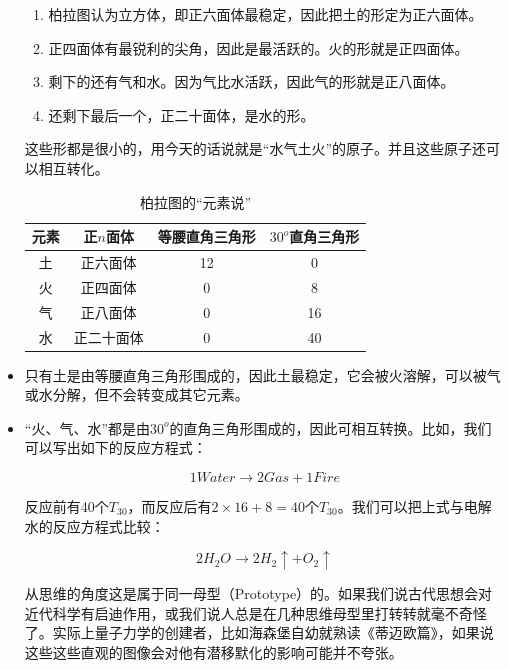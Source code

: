 \begin{itemize}
\begin{enumerate}
\item 柏拉图认为立方体，即正六面体最稳定，因此把土的形定为正六面体。
\item 正四面体有最锐利的尖角，因此是最活跃的。火的形就是正四面体。
\item 剩下的还有气和水。因为气比水活跃，因此气的形就是正八面体。
\item 还剩下最后一个，正二十面体，是水的形。
\end{enumerate}

这些形都是很小的，用今天的话说就是“水气土火”的原子。并且这些原子还可以相互转化。

\begin{table}[htdp]
\caption{柏拉图的“元素说”}
\begin{center}
\begin{tabular}{|c|c|c|c|}
\hline
元素 & 正$n$面体 & 等腰直角三角形 & $30^o$直角三角形 \\
\hline
土 & 正六面体 & 12 & 0  \\
火 & 正四面体 & 0 & 8 \\
气 & 正八面体 & 0 & 16 \\
水 & 正二十面体 & 0 & 40\\
\hline
\end{tabular}
\end{center}
\label{default}
\end{table}%

\item

只有土是由等腰直角三角形围成的，因此土最稳定，它会被火溶解，可以被气或水分解，但不会转变成其它元素。

\item 

“火、气、水”都是由$30^o$的直角三角形围成的，因此可相互转换。比如，我们可以写出如下的反应方程式：

\begin{equation*}
1 Water \to 2 Gas + 1 Fire 
\end{equation*}

反应前有40个$T_{30}$，而反应后有$2 \times 16 + 8 = 40$个$T_{30}$。我们可以把上式与电解水的反应方程式比较：

\begin{equation*}
2 H_2 O \to 2 H_2 \uparrow + O_2 \uparrow
\end{equation*}

从思维的角度这是属于同一母型（Prototype）的。如果我们说古代思想会对近代科学有启迪作用，或我们说人总是在几种思维母型里打转转就毫不奇怪了。实际上量子力学的创建者，比如海森堡自幼就熟读《蒂迈欧篇》，如果说这些这些直观的图像会对他有潜移默化的影响可能并不夸张。

\end{itemize}


